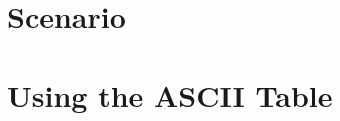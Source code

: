 





\makeatletter
\let\orig@lstnumber=\thelstnumber

\newcommand\lstsetnumber[1]{\gdef\thelstnumber{#1}}
\newcommand\lstresetnumber{\global\let\thelstnumber=\orig@lstnumber}
\makeatother

\renewcommand{\labnumber}{\keyboardpointerlabnumber}
\renewcommand{\labname}{Bit and Pointer Manipulation Lab}
\renewcommand{\shortlabname}{keyboardlab}
\renewcommand{\collaborationrules}{\keyboardpointerlabcollaboration}
\renewcommand{\duedate}{\keyboardpointerlabdue}

\newcommand{\tab}{\ensuremath{\longrightarrow}}
\newcommand{\nl}{\ensuremath{\hookleftarrow}}

\pagelayout

\labidentifier



\softwareengineeringfrontmatter

\section*{Scenario}                                             \FirstDayOnTheJob

\section{Using the ASCII Table}\label{sec:ascii}                

